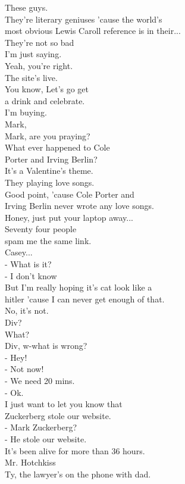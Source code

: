 \documentclass{article}
\begin{document}
\begin{multicols}{3}
These guys.\\
They're literary geniuses 'cause the world's\\
most obvious Lewis Caroll reference is in their...\\
They're not so bad\\
I'm just saying.\\
Yeah, you're right.\\
The site's live.\\
You know, Let's go get\\
a drink and celebrate.\\
I'm buying.\\
Mark,\\
Mark, are you praying?\\
What ever happened to Cole\\
Porter and Irving Berlin?\\
It's a Valentine's theme.\\
They playing love songs.\\
Good point, 'cause Cole Porter and\\
Irving Berlin never wrote any love songs.\\
Honey, just put your laptop away...\\
Seventy four people\\
spam me the same link.\\
Casey...\\
- What is it?\\
- I don't know\\
But I'm really hoping it's cat look like a\\
hitler 'cause I can never get enough of that.\\
No, it's not.\\
Div?\\
What?\\
Div, w-what is wrong?\\
- Hey!\\
- Not now!\\
- We need 20 mins.\\
- Ok.\\
I just want to let you know that\\
Zuckerberg stole our website.\\
- Mark Zuckerberg?\\
- He stole our website.\\
It's been alive for more than 36 hours.\\
Mr. Hotchkiss\\
Ty, the lawyer's on the phone with dad.\\

\end{multicols}
\end{document}
